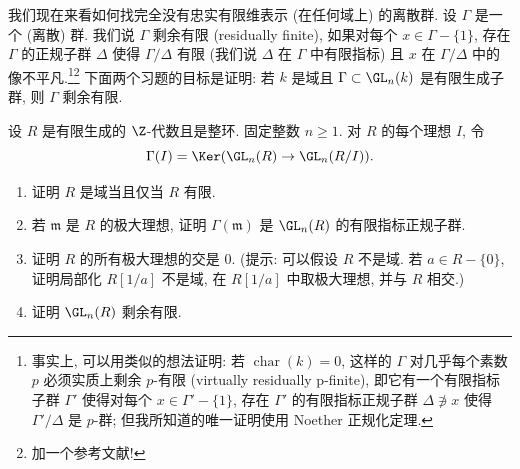 我们现在来看如何找完全没有忠实有限维表示 (在任何域上) 的离散群.
设 $\Gamma$ 是一个 (离散) 群. 我们说 $\Gamma$ 剩余有限 (residually finite), 如果对每个 $x \in \Gamma - \{1\}$, 存在 $\Gamma$ 的正规子群 $\Delta$ 使得 $\Gamma/\Delta$ 有限 (我们说 $\Delta$ 在 $\Gamma$ 中有限指标) 且 $x$ 在 $\Gamma/\Delta$ 中的像不平凡.\footnote{事实上, 可以用类似的想法证明: 若 $\operatorname{char}(k) = 0$, 这样的 $\Gamma$ 对几乎每个素数 $p$ 必须实质上剩余 $p$-有限 (virtually residually p-finite), 即它有一个有限指标子群 $\Gamma'$ 使得对每个 $x \in \Gamma' - \{1\}$, 存在 $\Gamma'$ 的有限指标正规子群 $\Delta \not\ni x$ 使得 $\Gamma'/\Delta$ 是 $p$-群; 但我所知道的唯一证明使用 Noether 正规化定理.}\footnote{加一个参考文献!}
下面两个习题的目标是证明: 若 $k$ 是域且 $\Gamma \subset \GL_n(k)$ 是有限生成子群, 则 $\Gamma$ 剩余有限.

\begin{exercise}[$\GL_n(R)$ 的剩余有限性]
\label{ex:I.5.5.5}
设 $R$ 是有限生成的 $\Z$-代数且是整环. 固定整数 $n \geq 1$. 对 $R$ 的每个理想 $I$, 令
\[
\Gamma(I) = \Ker(\GL_n(R) \to \GL_n(R/I)).
\]
\begin{enumerate}
\item[(a)] 证明 $R$ 是域当且仅当 $R$ 有限.
\item[(b)] 若 $\mathfrak{m}$ 是 $R$ 的极大理想, 证明 $\Gamma(\mathfrak{m})$ 是 $\GL_n(R)$ 的有限指标正规子群.
\item[(c)] 证明 $R$ 的所有极大理想的交是 $0$. (提示: 可以假设 $R$ 不是域. 若 $a \in R - \{0\}$, 证明局部化 $R[1/a]$ 不是域, 在 $R[1/a]$ 中取极大理想, 并与 $R$ 相交.)
\item[(d)] 证明 $\GL_n(R)$ 剩余有限.
\end{enumerate}
\end{exercise}

